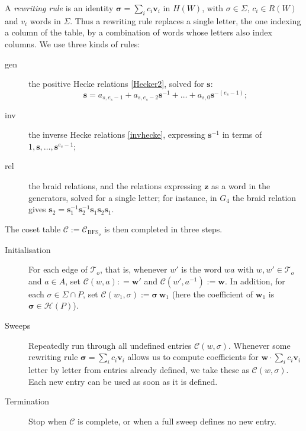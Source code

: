 \documentclass[11pt, reqno]{amsart}
\newcommand{\cC}{\mathcal{C}}
\newcommand{\cH}{\mathcal{H}}
\newcommand{\cT}{\mathcal{T}}
\newcommand{\bw}{\mathbf{w}}
\newcommand{\BFS}{\mathrm{BFS}}
\numberwithin{equation}{section}
\theoremstyle{remark}
\begin{document}
		
		A \emph{rewriting rule} is an identity
		$\boldsymbol\sigma=\sum_i c_i\mathbf v_i$ in $H(W)$, with $\sigma\in\Sigma$,
		$c_i\in R(W)$ and $v_i$ words in $\Sigma$. Thus a rewriting rule replaces a single letter, the one indexing a column of the table, by a combination of words whose letters also index columns. We use three kinds of rules:
		\begin{description}
			\item[\textsf{gen}] the positive Hecke relations \eqref{Hecker2}, solved for $\mathbf s$:
			$$\mathbf s=a_{s,e_s-1}+a_{s,e_s-2}\mathbf s^{-1}+\dots+a_{s,0}\mathbf s^{-(e_s-1)};$$
			\item[\textsf{inv}] the inverse Hecke relations \eqref{invhecke}, expressing $\mathbf s^{-1}$ in
			terms of $1,\mathbf s,\dots,\mathbf s^{e_s-1}$;\smallbreak
			\item[\textsf{rel}] the braid relations, and the relations expressing $\mathbf z$ as a
			word in the generators, solved for a single letter; for instance, in
			$G_4$ the braid relation gives
			$\mathbf s_2=\mathbf s_1^{-1}\mathbf s_2^{-1}\mathbf s_1\mathbf s_2\mathbf s_1$.
		\end{description}
		The coset table $\mathcal C:=\mathcal C_{\BFS_o}$ is then completed in three steps.
		\begin{description}
			\item[Initialisation] For each edge of $\cT_o$, that is, whenever $w'$ is the word $wa$ with $w, w' \in  \cT_o$ and $a \in A$, set $\mathcal C(w, a): = \bw'$ and $\mathcal C(w', a^{-1}) := \bw$. In addition, for each $\sigma \in  \Sigma \cap P$, set $\cC(w_1, \sigma) := \boldsymbol{\sigma}\, \bw_1$ (here the coefficient of $\bw_1$ is $\boldsymbol{\sigma} \in \cH(P)$).\smallbreak
			
			\item[Sweeps] Repeatedly run through all undefined entries $\mathcal C(w, \sigma)$. Whenever some rewriting rule $\boldsymbol\sigma=\sum_i c_i\mathbf v_i$ allows us to compute coefficients for $\bw \cdot \sum_i c_i\mathbf v_i$ letter by letter from entries already defined, we take these as $\mathcal C(w, \sigma)$. Each new entry can be used as soon as it is defined.\smallbreak
			
			\item[Termination] Stop when $\mathcal C$ is complete, or when a full sweep defines no new entry.
			
		\end{description}
		
\end{document}

